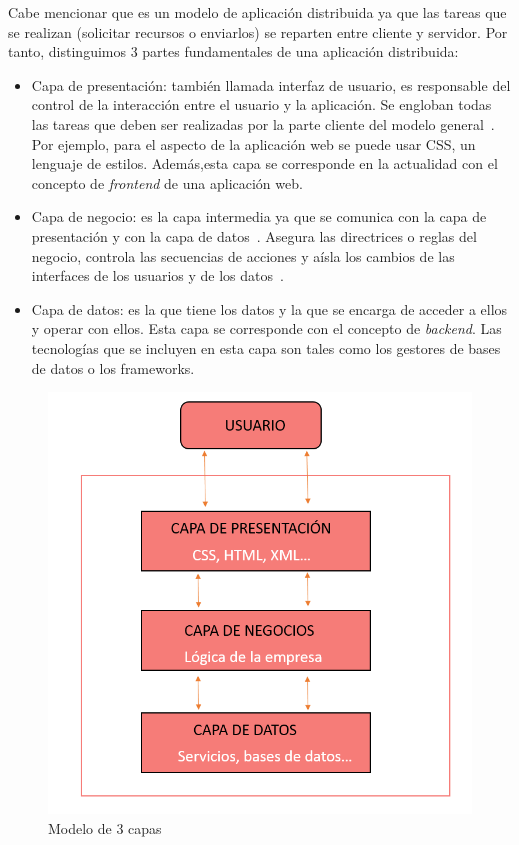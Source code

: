 \documentclass[a4paper, 12pt]{book}
\begin{document}
Cabe mencionar que es un modelo de aplicación distribuida ya que las tareas que se realizan (solicitar recursos o enviarlos) se reparten entre cliente y servidor. Por tanto, distinguimos 3 partes fundamentales de una aplicación distribuida:
\begin{itemize}
    \item Capa de presentación: también llamada interfaz de usuario, es responsable del control de la interacción entre el usuario y la aplicación. Se engloban todas las tareas que deben ser realizadas por la parte cliente del modelo general~\cite{marini2012modelo}. Por ejemplo, para el aspecto de la aplicación web se puede usar CSS, un lenguaje de estilos. Además,esta capa se corresponde en la actualidad con el concepto de \textit{frontend} de una aplicación web.
    \item Capa de negocio: es la capa intermedia ya que se comunica con la capa de presentación y con la capa de datos~\cite{bazurto2018arquitectura}. Asegura las directrices o reglas del negocio, controla las secuencias de acciones y aísla los cambios de las interfaces de los usuarios y de los datos~\cite{marini2012modelo}.
    \item Capa de datos: es la que tiene los datos y la que se encarga de acceder a ellos y operar con ellos. Esta capa se corresponde con el concepto de \textit{backend}. Las tecnologías que se incluyen en esta capa son tales como los gestores de bases de datos o los frameworks.
\end{itemize}
\begin{figure}[h]
        \centering
        \includegraphics[scale=0.4]{img/3capas.png}
        \caption{Modelo de 3 capas}
        \label{figura:3capas}
\end{figure}
\end{document}
